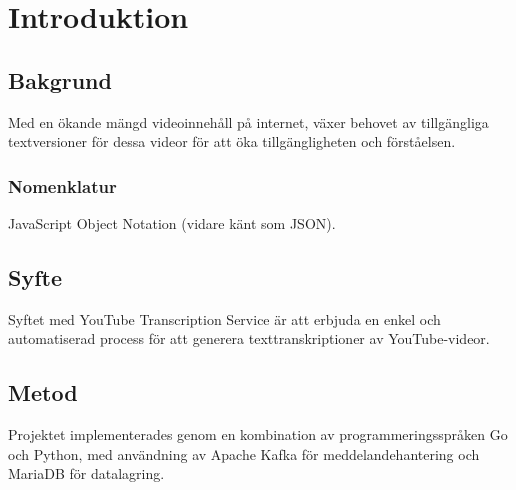 \chapter{Introduktion}

\section{Bakgrund}
Med en ökande mängd videoinnehåll på internet, växer behovet av tillgängliga textversioner för dessa videor för att öka tillgängligheten och förståelsen.

\subsection{Nomenklatur}
JavaScript Object Notation (vidare känt som JSON).

\section{Syfte}
Syftet med YouTube Transcription Service är att erbjuda en enkel och automatiserad process för att generera texttranskriptioner av YouTube-videor.

\section{Metod}
Projektet implementerades genom en kombination av programmeringsspråken Go och Python, med användning av Apache Kafka för meddelandehantering och MariaDB för datalagring.
